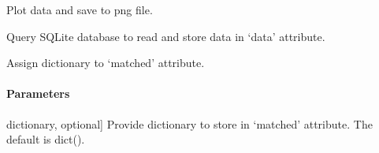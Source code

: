 \documentclass[letterpaper,10pt,english]{sphinxmanual}
\begin{document}
\begin{fulllineitems}
\begin{fulllineitems}
\label{\detokenize{_autosummary/functionfinder.classes.idealdata:functionfinder.classes.idealdata.draw}}
\pysigstartsignatures
{}
\pysigstopsignatures
\sphinxAtStartPar
Plot data and save to png file.

\end{fulllineitems}


\begin{fulllineitems}
\label{\detokenize{_autosummary/functionfinder.classes.idealdata:functionfinder.classes.idealdata.getdata}}
\pysigstartsignatures
{}
\pysigstopsignatures
\sphinxAtStartPar
Query SQLite database to read and store data in ‘data’ attribute.

\end{fulllineitems}


\begin{fulllineitems}
\label{\detokenize{_autosummary/functionfinder.classes.idealdata:functionfinder.classes.idealdata.matched_functions}}
\pysigstartsignatures
{}
\pysigstopsignatures
\sphinxAtStartPar
Assign dictionary to ‘matched’ attribute.


\paragraph{Parameters}
\label{\detokenize{_autosummary/functionfinder.classes.idealdata:id1}}\begin{description}
\sphinxlineitem{match\_result}{[}dictionary, optional{]}
\sphinxAtStartPar
Provide dictionary to store in ‘matched’ attribute.
The default is dict().

\end{description}

\end{fulllineitems}


\end{fulllineitems}
\end{document}
